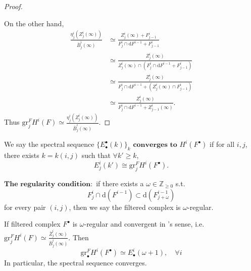 \begin{proof}
\begin{itemize}
    \end{itemize}
    On the other hand,
    \begin{align*}
        \frac{\eta_j^i(Z_j^i(\infty))}{\overline{B}^{i}_{j}(\infty)} & \simeq \frac{Z_j^i(\infty) + F_{j-1}^i}{F_j^i \cap \mathrm{d}F^{i-1} + F_{j-1}^i}          \\
                                                                     & \simeq \frac{Z_j^i(\infty)}{Z_j^i(\infty) \cap (F_j^i \cap \mathrm{d}F^{i-1} + F_{j-1}^i)} \\
                                                                     & \simeq \frac{Z_j^i(\infty)}{F_j^i \cap \mathrm{d}F^{i-1} + (Z_j^i(\infty) \cap F_{j-1}^i)} \\
                                                                     & \simeq \frac{Z_j^i(\infty)}{F_j^i \cap \mathrm{d}F^{i-1} + Z_{j-1}^i(\infty)}.
    \end{align*}
    Thus $\mathrm{gr}_{j}^{F}H^{i}(F) \simeq \frac{\eta_j^i(Z_j^i(\infty))}{\overline{B}^{i}_{j}(\infty)}$.
\end{proof}

\quad

\begin{definition}\label{def:convergent_spectral_sequence}
    We say the spectral sequence $\{E_{\bullet}^{\bullet}(k)\}_k$ $\textbf{converges to}$ $H^i(F^{\bullet})$ if for all $i,j$, there exists $k = k(i,j)$ such that $\forall k' \ge k$, $$E_j^i(k') \cong \mathrm{gr}_j^F H^i(F^{\bullet}).$$
\end{definition}

\begin{definition}$\textbf{The regularity condition}:$
    if there exists a $\omega \in \mathbb{Z}_{\ge0}$ s.t.$$F_j^i \cap \mathrm{d}(F^{i-1}_{}) \subset \mathrm{d}(F_{j+\omega}^{i-1})$$for every pair $(i,j)$, then we say the filtered complex is $\omega$-regular.
\end{definition}

\begin{lemma}\label{lemma 7.8}
    If filtered complex $F^{\bullet}$ is $\omega$-regular and convergent in \cite[Convergence~5.2.11]{Weibel1994HA}'s sense, i.e. $\mathrm{gr}_{j}^{F}H^{i}(F) \simeq \frac{\overline{Z}_j^i(\infty)}{\overline{B}^{i}_{j}(\infty)}$. Then $$\mathrm{gr}^F_{\bullet} H^{i}(F^\bullet) \simeq E_{\bullet}^{i}(\omega+1), \quad \forall i$$In particular, the spectral sequence converges.
\end{lemma}


